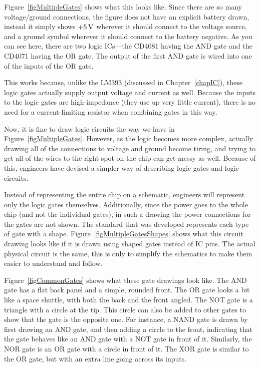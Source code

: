 Figure~\ref{figMultipleGates} shows what this looks like.
Since there are so many voltage/ground connections, the figure does not have an explicit battery drawn, instead it simply shows $+5\,\si{\volt}$ wherever it should connect to the voltage source, and a ground symbol wherever it should connect to the battery negative.
As you can see here, there are two logic ICs---the CD4081 having the AND gate and the CD4071 having the OR gate.
The output of the first AND gate is wired into one of the inputs of the OR gate.

This works because, unlike the LM393 (discussed in Chapter~\ref{chapIC}), these logic gates actually supply output voltage and current as well.  
Because the inputs to the logic gates are high-impedance (they use up very little current), there is no need for a current-limiting resistor when combining gates in this way.

Now, it is fine to draw logic circuits the way we have in Figure~\ref{figMultipleGates}.
However, as the logic becomes more complex, actually drawing all of the connections to voltage and ground become tiring, and trying to get all of the wires to the right spot on the chip can get messy as well.
Because of this, engineers have devised a simpler way of describing logic gates and logic circuits.


Instead of representing the entire chip on a schematic, engineers will represent only the logic gates themselves.
Additionally, since the power goes to the whole chip (and not the individual gates), in such a drawing the power connections for the gates are not shown.
The standard that was developed represents each type of gate with a shape.
Figure~\ref{figMultipleGatesShapes} shows what this circuit drawing looks like if it is drawn using shaped gates instead of IC pins.
The actual physical circuit is the same, this is only to simplify the schematics to make them easier to understand and follow.


Figure~\ref{figCommonGates} shows what these gate drawings look like.
The AND gate has a flat back panel and a simple, rounded front.
The OR gate looks a bit like a space shuttle, with both the back and the front angled.
The NOT gate is a triangle with a circle at the tip.
This circle can also be added to other gates to show that the gate is the opposite one.
For instance, a NAND gate is drawn by first drawing an AND gate, and then adding a circle to the front, indicating that the gate behaves like an AND gate with a NOT gate in front of it.
Similarly, the NOR gate is an OR gate with a circle in front of it.
The XOR gate is similar to the OR gate, but with an extra line going across its inputs.

